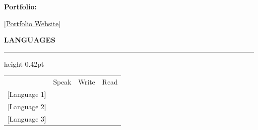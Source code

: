 \documentclass[10pt,a4paper]{article}
\newcommand{\sideheading}[1]{%
  {\fontsize{16.5}{19}\selectfont
   \bfseries\color{muted} #1\par}%
  \vspace{0.8mm}
  \hrule height 0.42pt
  \vspace{2.7mm}%
}
\newcommand{\checkmarkcv}{\ding{51}}
\begin{document}
\begin{minipage}[t]{81.3mm}
\begin{minipage}[t]{68.0mm}
    \vspace{4.2mm}

    {\bfseries\color{muted} Portfolio:}\par
    \href{https://example.com}
      {\underline{[Portfolio Website]}}\par

    \vspace{6.4mm}


    \sideheading{LANGUAGES}

    \fontsize{10.0}{14.4}\selectfont
    \renewcommand{\arraystretch}{1.25}
    \setlength{\tabcolsep}{3pt}

    \begin{tabular}{
      @{}
      p{25mm}
      >{\centering\arraybackslash}p{12mm}
      >{\centering\arraybackslash}p{12mm}
      >{\centering\arraybackslash}p{12mm}
      @{}
    }
      & Speak & Write & Read \\

      [Language 1] &
      \checkmarkcv & \checkmarkcv & \checkmarkcv \\[2.9mm]

      [Language 2] &
      \checkmarkcv & \checkmarkcv & \checkmarkcv \\[2.9mm]

      [Language 3] &
      \checkmarkcv & \checkmarkcv & \checkmarkcv
    \end{tabular}

  \end{minipage}
\end{minipage}%
\end{document}
